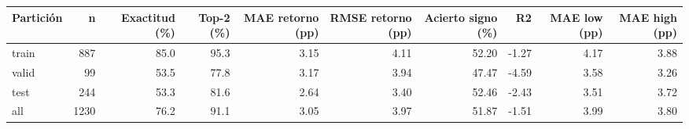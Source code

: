 \begin{tabular}{lrrrrrrrrr}
\toprule
Partición &    n & Exactitud (\%) & Top-2 (\%) & MAE retorno (pp) & RMSE retorno (pp) & Acierto signo (\%) &    R2 & MAE low (pp) & MAE high (pp) \\
\midrule
    train &  887 &          85.0 &      95.3 &             3.15 &              4.11 &             52.20 & -1.27 &         4.17 &          3.88 \\
    valid &   99 &          53.5 &      77.8 &             3.17 &              3.94 &             47.47 & -4.59 &         3.58 &          3.26 \\
     test &  244 &          53.3 &      81.6 &             2.64 &              3.40 &             52.46 & -2.43 &         3.51 &          3.72 \\
      all & 1230 &          76.2 &      91.1 &             3.05 &              3.97 &             51.87 & -1.51 &         3.99 &          3.80 \\
\bottomrule
\end{tabular}

